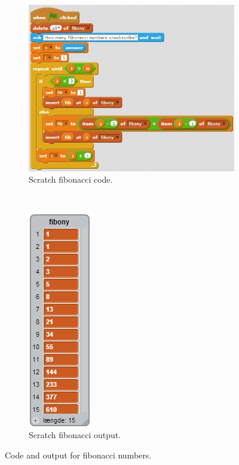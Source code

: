 \begin{figure}[h]
  \centering
    \begin{subfigure}[b]{0.45\textwidth}
    \begin{center}
      \includegraphics[scale=0.7]{./pics/scratch_fibo_code}
      \caption{Scratch fibonacci code.}
      \label{fig:scratch_fibo_code}
    \end{center}
    \end{subfigure}
    ~
    \begin{subfigure}[b]{0.45\textwidth}
    \begin{center}
      \includegraphics[scale=0.6]{./pics/scratch_fibo_out}
      \caption{Scratch fibonacci output.}
      \label{fig:scratch_fibo_out}
    \end{center}
    \end{subfigure}
    \caption{Code and output for fibonacci numbers.}
    \label{fig:scratch_fibo}
\end{figure}

